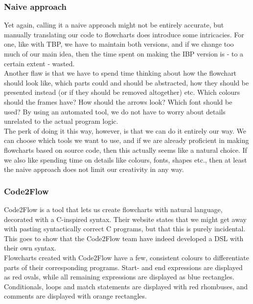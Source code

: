 \subsubsection{Naive approach}

Yet again, calling it a naive approach might not be entirely accurate, but manually translating our code to flowcharts does introduce some intricacies. For one, like with TBP, we have to maintain both versions, and if we change too much of our main idea, then the time spent on making the IBP version is - to a certain extent - wasted. \\

Another flaw is that we have to spend time thinking about how the flowchart should look like, which parts could and should be abstracted, how they should be presented instead (or if they should be removed altogether) etc. Which colours should the frames have? How should the arrows look? Which font should be used? By using an automated tool, we do not have to worry about details unrelated to the actual program logic. \\

The perk of doing it this way, however, is that we can do it entirely our way. We can choose which tools we want to use, and if we are already proficient in making flowcharts based on source code, then this actually seems like a natural choice. If we also like spending time on details like colours, fonts, shapes etc., then at least the naive approach does not limit our creativity in any way. \\


\subsubsection{Code2Flow}

Code2Flow is a tool that lets us create flowcharts with natural language, decorated with a C-inspired syntax. Their website states that we might get away with pasting syntactically correct C programs, but that this is purely incidental. This goes to show that the Code2Flow team have indeed developed a DSL with their own syntax. \\

Flowcharts created with Code2Flow have a few, consistent colours to differentiate parts of their corresponding programs. Start- and end expressions are displayed as red ovals, while all remaining expressions are displayed as blue rectangles. Conditionals, loops and match statements are displayed with red rhombuses, and comments are displayed with orange rectangles. \\

